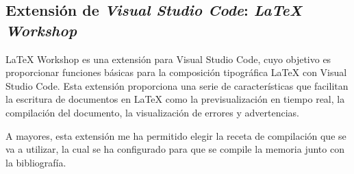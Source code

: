 \subsection{Extensión de \textit{Visual Studio Code}: \textit{LaTeX Workshop}}

LaTeX Workshop es una extensión para Visual Studio Code, cuyo objetivo es proporcionar funciones básicas para la composición tipográfica LaTeX con Visual Studio Code. Esta extensión proporciona una serie de características que facilitan la escritura de documentos en LaTeX como la previsualización en tiempo real, la compilación del documento, la visualización de errores y advertencias.

A mayores, esta extensión me ha permitido elegir la receta de compilación que se va a utilizar, la cual se ha configurado para que se compile la memoria junto con la bibliografía.

